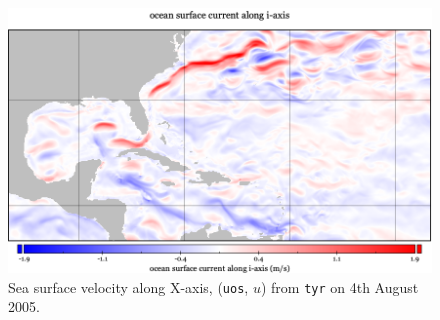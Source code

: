 \begin{figure}
\vspace{-10pt}
\includegraphics[width=\linewidth]{images/example-images/uos.png}
\caption{Sea surface velocity along X-axis, (\texttt{uos}, $u$) from \texttt{tyr}
on 4th August 2005. }
\label{fig:uos}
\end{figure}
